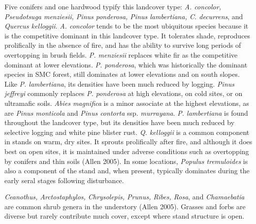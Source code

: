 Five conifers and one hardwood typify this landcover type: \emph{A. concolor, Pseudotsuga menziesii, Pinus ponderosa, Pinus lambertiana, C. decurrens}, and \emph{Quercus kelloggii}. \emph{A. concolor} tends to be the most ubiquitous species because it is the competitive dominant in this landcover type. It tolerates shade, reproduces prolifically in the absence of fire, and has the ability to survive long periods of overtopping in brush fields. \emph{P. menziesii} replaces white fir as the competitive dominant at lower elevations. \emph{P. ponderosa}, which was historically the dominant species in SMC forest, still dominates at lower elevations and on south slopes. Like \emph{P. lambertiana}, its densities have been much reduced by logging. \emph{Pinus jeffreyi} commonly replaces \emph{P. ponderosa} at high elevations, on cold sites, or on ultramafic soils. \emph{Abies magnifica} is a minor associate at the highest elevations, as are \emph{Pinus monticola} and \emph{Pinus contorta} ssp. \emph{murrayana}. \emph{P. lambertiana} is found throughout the landcover type, but its densities have been much reduced by selective logging and white pine blister rust. \emph{Q. kelloggii} is a common component in stands on warm, dry sites. It sprouts prolifically after fire, and although it does best on open sites, it is maintained under adverse conditions such as overtopping by conifers and thin soils (Allen 2005). In some locations, \emph{Populus tremuloides} is also a component of the stand and, when present, typically dominates during the early seral stages following disturbance.

\emph{Ceanothus, Arctostaphylos, Chrysolepis, Prunus, Ribes, Rosa}, and \emph{Chamaebatia} are common shrub genera in the understory (Allen 2005). Grasses and forbs are diverse but rarely contribute much cover, except where stand structure is open. 


